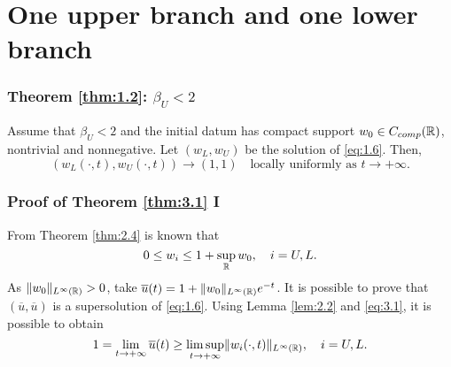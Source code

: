 \section{One upper branch and one lower branch}


    




\begin{frame}
    \frametitle{Theorem \ref{thm:1.2}: \texorpdfstring{\(\beta_U < 2\)}{betaU < 2}}
    \begin{theorem}
        Assume that \(\beta_U < 2\) and the initial datum has compact support \(w_{0} \in C_{comp}(\mathbb{R})\), nontrivial and nonnegative. Let \((w_L, w_{U})\) be the solution of \eqref{eq:1.6}. Then,
        \[
            (w_L(\cdot, t), w_{U}(\cdot, t)) \to (1, 1) \quad \text{locally uniformly as } t \to +\infty.
        \]
        \label{thm:3.1} 
    \end{theorem}
\end{frame}


\begin{frame}
    \frametitle{Proof of Theorem \ref{thm:3.1} I}
    \begin{proofs}
        From Theorem \ref{thm:2.4} is known that 
    \begin{equation}
        0 \leq w_{i} \leq 1 + \sup_{\mathbb{R}} w_{0}, \quad i = U, L.
        \label{eq:3.1}
    \end{equation}
    As \(\lVert w_{0}\rVert_{L^{\infty}(\mathbb{R})} > 0\), take \(\overline{u}(t) = 1 + \lVert w_{0}\rVert_{L^{\infty}(\mathbb{R})}e^{-t}\). 
    It is possible to prove that \((\overline{u}, \overline{u})\) is a supersolution of \eqref{eq:1.6}. Using Lemma \ref{lem:2.2} and \eqref{eq:3.1}, it is possible to obtain 
    \begin{equation}
        1 = \lim_{t \to +\infty} \overline{u}(t) \geq \limsup_{t \to +\infty} \lVert w_i(\cdot, t)\rVert_{L^{\infty}(\mathbb{R})}, \quad i = U, L.
        \label{eq:3.2}
    \end{equation}
    \end{proofs}
\end{frame}

